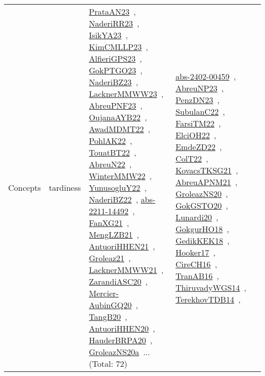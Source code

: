 {\begin{longtable}{lp{3cm}>{\raggedright\arraybackslash}p{6cm}>{\raggedright\arraybackslash}p{6cm}>{\raggedright\arraybackslash}p{8cm}}
\index{tardiness}\index{Concepts!tardiness}Concepts & tardiness & \href{../works/PrataAN23.pdf}{PrataAN23}~\cite{PrataAN23}, \href{../works/NaderiRR23.pdf}{NaderiRR23}~\cite{NaderiRR23}, \href{../works/IsikYA23.pdf}{IsikYA23}~\cite{IsikYA23}, \href{../works/KimCMLLP23.pdf}{KimCMLLP23}~\cite{KimCMLLP23}, \href{../works/AlfieriGPS23.pdf}{AlfieriGPS23}~\cite{AlfieriGPS23}, \href{../works/GokPTGO23.pdf}{GokPTGO23}~\cite{GokPTGO23}, \href{../works/NaderiBZ23.pdf}{NaderiBZ23}~\cite{NaderiBZ23}, \href{../works/LacknerMMWW23.pdf}{LacknerMMWW23}~\cite{LacknerMMWW23}, \href{../works/AbreuPNF23.pdf}{AbreuPNF23}~\cite{AbreuPNF23}, \href{../works/OujanaAYB22.pdf}{OujanaAYB22}~\cite{OujanaAYB22}, \href{../works/AwadMDMT22.pdf}{AwadMDMT22}~\cite{AwadMDMT22}, \href{../works/PohlAK22.pdf}{PohlAK22}~\cite{PohlAK22}, \href{../works/TouatBT22.pdf}{TouatBT22}~\cite{TouatBT22}, \href{../works/AbreuN22.pdf}{AbreuN22}~\cite{AbreuN22}, \href{../works/WinterMMW22.pdf}{WinterMMW22}~\cite{WinterMMW22}, \href{../works/YunusogluY22.pdf}{YunusogluY22}~\cite{YunusogluY22}, \href{../works/NaderiBZ22.pdf}{NaderiBZ22}~\cite{NaderiBZ22}, \href{../works/abs-2211-14492.pdf}{abs-2211-14492}~\cite{abs-2211-14492}, \href{../works/FanXG21.pdf}{FanXG21}~\cite{FanXG21}, \href{../works/MengLZB21.pdf}{MengLZB21}~\cite{MengLZB21}, \href{../works/AntuoriHHEN21.pdf}{AntuoriHHEN21}~\cite{AntuoriHHEN21}, \href{../works/Groleaz21.pdf}{Groleaz21}~\cite{Groleaz21}, \href{../works/LacknerMMWW21.pdf}{LacknerMMWW21}~\cite{LacknerMMWW21}, \href{../works/ZarandiASC20.pdf}{ZarandiASC20}~\cite{ZarandiASC20}, \href{../works/Mercier-AubinGQ20.pdf}{Mercier-AubinGQ20}~\cite{Mercier-AubinGQ20}, \href{../works/TangB20.pdf}{TangB20}~\cite{TangB20}, \href{../works/AntuoriHHEN20.pdf}{AntuoriHHEN20}~\cite{AntuoriHHEN20}, \href{../works/HauderBRPA20.pdf}{HauderBRPA20}~\cite{HauderBRPA20}, \href{../works/GroleazNS20a.pdf}{GroleazNS20a}~\cite{GroleazNS20a}... (Total: 72) & \href{../works/abs-2402-00459.pdf}{abs-2402-00459}~\cite{abs-2402-00459}, \href{../works/AbreuNP23.pdf}{AbreuNP23}~\cite{AbreuNP23}, \href{../works/PenzDN23.pdf}{PenzDN23}~\cite{PenzDN23}, \href{../works/SubulanC22.pdf}{SubulanC22}~\cite{SubulanC22}, \href{../works/FarsiTM22.pdf}{FarsiTM22}~\cite{FarsiTM22}, \href{../works/ElciOH22.pdf}{ElciOH22}~\cite{ElciOH22}, \href{../works/EmdeZD22.pdf}{EmdeZD22}~\cite{EmdeZD22}, \href{../works/ColT22.pdf}{ColT22}~\cite{ColT22}, \href{../works/KovacsTKSG21.pdf}{KovacsTKSG21}~\cite{KovacsTKSG21}, \href{../works/AbreuAPNM21.pdf}{AbreuAPNM21}~\cite{AbreuAPNM21}, \href{../works/GroleazNS20.pdf}{GroleazNS20}~\cite{GroleazNS20}, \href{../works/GokGSTO20.pdf}{GokGSTO20}~\cite{GokGSTO20}, \href{../works/Lunardi20.pdf}{Lunardi20}~\cite{Lunardi20}, \href{../works/GokgurHO18.pdf}{GokgurHO18}~\cite{GokgurHO18}, \href{../works/GedikKEK18.pdf}{GedikKEK18}~\cite{GedikKEK18}, \href{../works/Hooker17.pdf}{Hooker17}~\cite{Hooker17}, \href{../works/CireCH16.pdf}{CireCH16}~\cite{CireCH16}, \href{../works/TranAB16.pdf}{TranAB16}~\cite{TranAB16}, \href{../works/ThiruvadyWGS14.pdf}{ThiruvadyWGS14}~\cite{ThiruvadyWGS14}, \href{../works/TerekhovTDB14.pdf}{TerekhovTDB14}~\cite{TerekhovTDB14}, 
\end{longtable}}
